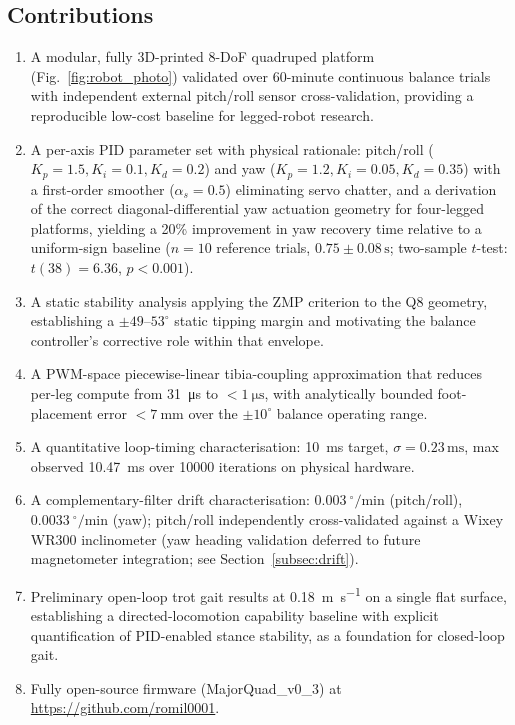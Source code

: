 \documentclass[journal]{IEEEtran}
\newcommand{\dg}{^{\circ}}
\begin{document}
\subsection{Contributions}
\label{subsec:contributions}
\begin{enumerate}
\item A modular, fully 3D-printed 8-DoF quadruped platform
      (Fig.~\ref{fig:robot_photo}) validated over 60-minute
      continuous balance trials with independent external
      pitch/roll sensor cross-validation, providing a
      reproducible low-cost baseline for legged-robot research.
\item A per-axis PID parameter set with physical rationale:
      pitch/roll ($K_p=1.5, K_i=0.1, K_d=0.2$) and yaw
      ($K_p=1.2, K_i=0.05, K_d=0.35$) with a first-order
      smoother ($\alpha_s=0.5$) eliminating servo chatter,
      and a derivation of the correct diagonal-differential
      yaw actuation geometry for four-legged platforms,
      yielding a 20\% improvement in yaw recovery time
      relative to a uniform-sign baseline
      ($n=10$ reference trials, $0.75\pm0.08\,\text{s}$;
      two-sample $t$-test: $t(38)=6.36$, $p<0.001$).
\item A static stability analysis applying the ZMP criterion
      to the Q8 geometry, establishing a $\pm49$--$53\dg$
      static tipping margin and motivating the balance
      controller's corrective role within that envelope.
\item A PWM-space piecewise-linear tibia-coupling approximation
      that reduces per-leg compute from \SI{31}{\micro\second}
      to $<\SI{1}{\micro\second}$, with analytically bounded
      foot-placement error $<\SI{7}{\milli\metre}$ over the
      $\pm10\dg$ balance operating range.
\item A quantitative loop-timing characterisation:
      \SI{10}{\milli\second} target, $\sigma=0.23\,\text{ms}$,
      max observed \SI{10.47}{\milli\second} over \num{10000}
      iterations on physical hardware.
\item A complementary-filter drift characterisation:
      $\SI{0.003}{\dg\per\minute}$ (pitch/roll),
      $\SI{0.0033}{\dg\per\minute}$ (yaw); pitch/roll
      independently cross-validated against a Wixey WR300
      inclinometer (yaw heading validation deferred to
      future magnetometer integration; see Section~\ref{subsec:drift}).
\item Preliminary open-loop trot gait results at
      \SI{0.18}{\metre\per\second} on a single flat surface,
      establishing a directed-locomotion capability baseline
      with explicit quantification of PID-enabled stance
      stability, as a foundation for closed-loop gait.
\item Fully open-source firmware (MajorQuad\_v0\_3) at
      \url{https://github.com/romil0001}.
\end{enumerate}
\end{document}
